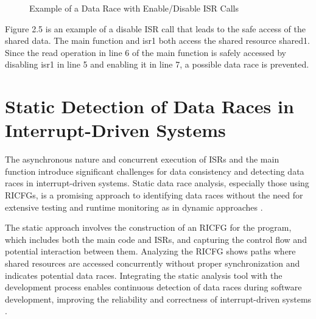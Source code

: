 \documentclass[
fancyheadings, %
%
%
]{stsreprt}
\begin{document}
{\begin{figure}[H]
\begin{algorithm}[H]
				
				
				
			\end{algorithm}
			\caption{Example of a Data Race with Enable/Disable \ac{ISR} Calls}
		\end{figure}
		
		Figure 2.5 is an example of a disable \ac{ISR} call that leads to the safe access of the shared data. The main function and isr1 both access the shared resource shared1. Since the read operation in line 6 of the main function is safely accessed by disabling isr1 in line 5 and enabling it in line 7, a possible data race is prevented.
		
		\section{Static Detection of Data Races in Interrupt-Driven Systems}
		
		The asynchronous nature and concurrent execution of \acp{ISR} and the main function introduce significant challenges for data consistency and detecting data races in interrupt-driven systems. Static data race analysis, especially those using \acp{RICFG}, is a promising approach to identifying data races without the need for extensive testing and runtime monitoring as in dynamic approaches \cite{wang2020}.
		
		The static approach involves the construction of an \ac{RICFG} for the program, which includes both the main code and \acp{ISR}, and capturing the control flow and potential interaction between them. Analyzing the \ac{RICFG} shows paths where shared resources are accessed concurrently without proper synchronization and indicates potential data races. Integrating the static analysis tool with the development process enables continuous detection of data races during software development, improving the reliability and correctness of interrupt-driven systems \cite{wang2020}.
		
}
\end{document}
